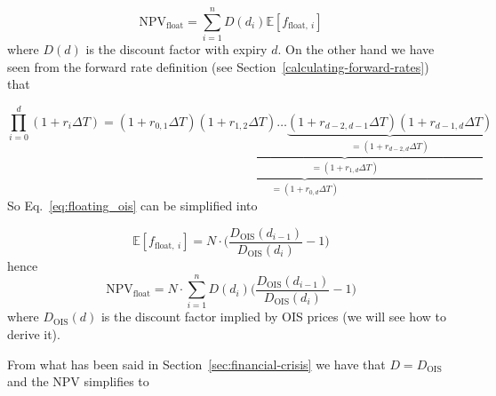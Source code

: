 \begin{equation}
\mathrm{NPV}_{\mathrm{float}} = \sum_{i=1}^{n}D(d_i)\mathbb{E}[f_{\mathrm{float},~i}]
\end{equation}
where \(D(d)\) is the discount factor with expiry \(d\). On the other hand we have seen from the forward rate definition (see Section~\ref{calculating-forward-rates}) that

\begin{equation*}
\prod_{i=0}^{d} (1+r_i\Delta T) = \underbrace{(1+r_{0,1}\Delta T)\underbrace{(1+r_{1,2}\Delta T)\ldots\underbrace{(1+r_{d-2,d-1}\Delta T)(1+r_{d-1,d}\Delta T)}_{=(1+r_{d-2,d}\Delta T)}}_{=(1+r_{1,d}\Delta T)}}_{=(1+r_{0,d}\Delta T)}
\end{equation*}
So Eq.~\ref{eq:floating_ois} can be simplified into

\begin{equation}
\mathbb{E}[f_{\mathrm{float},~i}] = N\cdot\Big(\frac{D_{\mathrm{OIS}}(d_{i-1})}{D_{\mathrm{OIS}}(d_{i})} - 1\Big)
\end{equation}
hence
\begin{equation}
\mathrm{NPV}_{\mathrm{float}} = N\cdot \sum_{i=1}^{n}D(d_i) \Big(\frac{D_{\mathrm{OIS}}(d_{i-1})}{D_{\mathrm{OIS}}(d_{i})} - 1\Big)
\end{equation}
where \(D_{\mathrm{OIS}}(d)\) is the discount factor implied by OIS prices (we will see how to derive it).

%

From what has been said in Section~\ref{sec:financial-crisis} we have that \(D = D_{\mathrm{OIS}}\) and the NPV simplifies to

